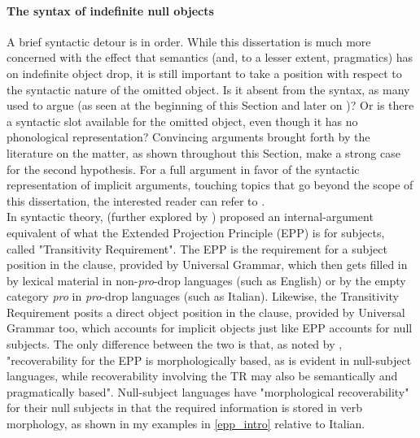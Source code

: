 \paragraph{The syntax of indefinite null objects} A brief syntactic detour is in order. While this dissertation is much more concerned with the effect that semantics (and, to a lesser extent, pragmatics) has on indefinite object drop, it is still important to take a position with respect to the syntactic nature of the omitted object. Is it absent from the syntax, as many used to argue (as seen at the beginning of this Section and later on )? Or is there a syntactic slot available for the omitted object, even though it has no phonological representation? Convincing arguments brought forth by the literature on the matter, as shown throughout this Section, make a strong case for the second hypothesis. For a full argument in favor of the syntactic representation of implicit arguments, touching topics that go beyond the scope of this dissertation, the interested reader can refer to \textcite{Landau2010}.\\
In syntactic theory, \textcite{roberge2002transitivity} (further explored by \textcite{CumminsRoberge2004, CumminsRoberge2005}) proposed an internal-argument equivalent of what the Extended Projection Principle (EPP) \parencite{chomsky1982epp} is for subjects, called "Transitivity Requirement". The EPP is the requirement for a subject position in the clause, provided by Universal Grammar, which then gets filled in by lexical material in non-\textit{pro}-drop languages (such as English) or by the empty category \textit{pro} in \textit{pro}-drop languages (such as Italian). Likewise, the Transitivity Requirement posits a direct object position in the clause, provided by Universal Grammar too, which accounts for implicit objects just like EPP accounts for null subjects. The only difference between the two is that, as noted by \textcite{CumminsRoberge2004}, "recoverability for the EPP is morphologically based, as is evident in null-subject languages, while recoverability involving the TR may also be semantically and pragmatically based". Null-subject languages have "morphological recoverability" for their null subjects in that the required information is stored in verb morphology, as shown in my examples in \ref{epp_intro} relative to Italian.

